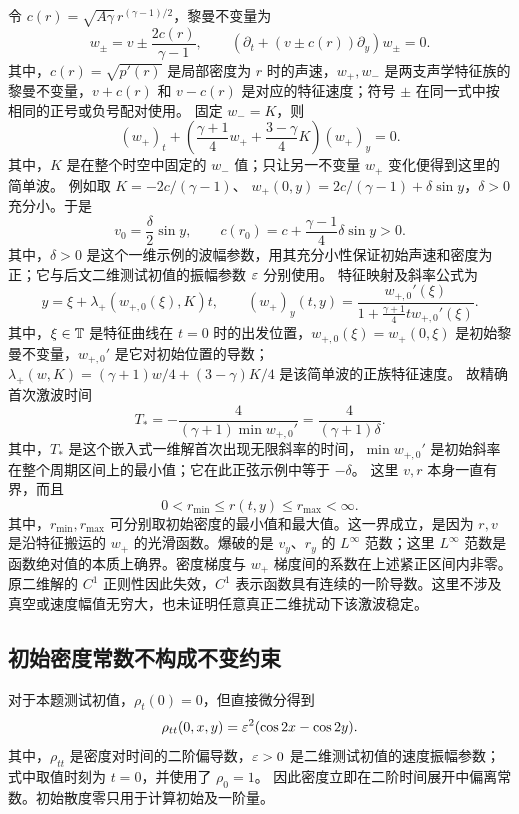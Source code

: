 令 $c(r)=\sqrt{A\gamma}\,r^{(\gamma-1)/2}$，黎曼不变量为
\[
 w_\pm=v\pm\frac{2c(r)}{\gamma-1},\qquad
 (\partial_t+(v\pm c(r))\partial_y)w_\pm=0.
\]
其中，$c(r)=\sqrt{p'(r)}$ 是局部密度为 $r$ 时的声速，$w_+,w_-$ 是两支声学特征族的黎曼不变量，$v+c(r)$ 和 $v-c(r)$ 是对应的特征速度；符号 $\pm$ 在同一式中按相同的正号或负号配对使用。
固定 $w_-=K$，则
\begin{equation}\label{eq:simple}
 (w_+)_t+\left(\frac{\gamma+1}{4}w_+
       +\frac{3-\gamma}{4}K\right)(w_+)_y=0.
\end{equation}
其中，$K$ 是在整个时空中固定的 $w_-$ 值；只让另一不变量 $w_+$ 变化便得到这里的简单波。
例如取 $K=-2c/(\gamma-1)$、
$w_+(0,y)=2c/(\gamma-1)+\delta\sin y$，$\delta>0$ 充分小。于是
\[
 v_0=\frac\delta2\sin y,\qquad
 c(r_0)=c+\frac{\gamma-1}{4}\delta\sin y>0.
\]
其中，$\delta>0$ 是这个一维示例的波幅参数，用其充分小性保证初始声速和密度为正；它与后文二维测试初值的振幅参数 $\varepsilon$ 分别使用。
特征映射及斜率公式为
\[
 y=\xi+\lambda_+(w_{+,0}(\xi),K)t,\qquad
 (w_+)_y(t,y)=\frac{w_{+,0}'(\xi)}{1+\frac{\gamma+1}{4}t w_{+,0}'(\xi)}.
\]
其中，$\xi\in\mathbb T$ 是特征曲线在 $t=0$ 时的出发位置，$w_{+,0}(\xi)=w_+(0,\xi)$ 是初始黎曼不变量，$w_{+,0}'$ 是它对初始位置的导数；$\lambda_+(w,K)=(\gamma+1)w/4+(3-\gamma)K/4$ 是该简单波的正族特征速度。
故精确首次激波时间
\begin{equation}\label{eq:embeddedtime}
 T_*=-\frac4{(\gamma+1)\min w_{+,0}'}=\frac4{(\gamma+1)\delta}.
\end{equation}
其中，$T_*$ 是这个嵌入式一维解首次出现无限斜率的时间，$\min w_{+,0}'$ 是初始斜率在整个周期区间上的最小值；它在此正弦示例中等于 $-\delta$。
这里 $v,r$ 本身一直有界，而且
\[
 0<r_{\min}\le r(t,y)\le r_{\max}<\infty.
\]
其中，$r_{\min},r_{\max}$ 可分别取初始密度的最小值和最大值。这一界成立，是因为 $r,v$ 是沿特征搬运的 $w_+$ 的光滑函数。爆破的是 $v_y$、$r_y$ 的 $L^\infty$ 范数；这里 $L^\infty$ 范数是函数绝对值的本质上确界。密度梯度与 $w_+$ 梯度间的系数在上述紧正区间内非零。原二维解的 $C^1$ 正则性因此失效，$C^1$ 表示函数具有连续的一阶导数。这里不涉及真空或速度幅值无穷大，也未证明任意真正二维扰动下该激波稳定。

\subsection{初始密度常数不构成不变约束}
对于本题测试初值，$\rho_t(0)=0$，但直接微分得到
\begin{equation}\label{eq:rhott}
 \rho_{tt}(0,x,y)=\varepsilon^2(\cos2x-\cos2y).
\end{equation}
其中，$\rho_{tt}$ 是密度对时间的二阶偏导数，$\varepsilon>0$ 是二维测试初值的速度振幅参数；式中取值时刻为 $t=0$，并使用了 $\rho_0=1$。
因此密度立即在二阶时间展开中偏离常数。初始散度零只用于计算初始及一阶量。

